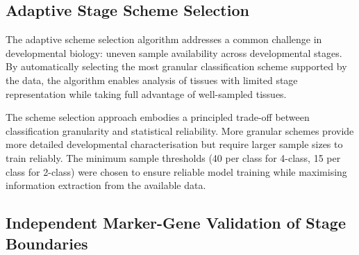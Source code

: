 \subsection{Adaptive Stage Scheme Selection}

The adaptive scheme selection algorithm addresses a common challenge in developmental biology: uneven sample availability across developmental stages. By automatically selecting the most granular classification scheme supported by the data, the algorithm enables analysis of tissues with limited stage representation while taking full advantage of well-sampled tissues.

The scheme selection approach embodies a principled trade-off between classification granularity and statistical reliability. More granular schemes provide more detailed developmental characterisation but require larger sample sizes to train reliably. The minimum sample thresholds (40 per class for 4-class, 15 per class for 2-class) were chosen to ensure reliable model training while maximising information extraction from the available data.

\subsection{Independent Marker-Gene Validation of Stage Boundaries}

